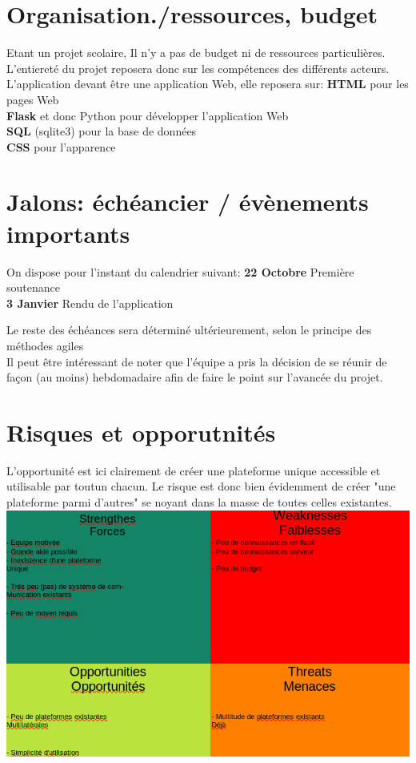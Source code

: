 \newpage

\section*{Organisation./ressources, budget}
Etant un projet scolaire, Il n'y a pas de budget ni de ressources particulières. L'entiereté du projet reposera donc sur les compétences des différents acteurs.\\
L'application devant être une application Web, elle reposera sur:
	\textbf{HTML} pour les pages Web \\
	\textbf{Flask} et donc Python pour développer l'application Web \\
	\textbf{SQL} (sqlite3) pour la base de données \\
	\textbf{CSS} pour l'apparence

\section*{Jalons: échéancier / évènements importants}
On dispose pour l'instant du calendrier suivant:
	\textbf{22 Octobre} Première soutenance \\
	\textbf{3 Janvier} Rendu de l'application

Le reste des échéances sera déterminé ultérieurement, selon le principe des méthodes agiles \\
Il peut être intéressant de noter que l'équipe a pris la décision de se réunir de façon (au moins) hebdomadaire afin de faire le point sur l'avancée du projet.


\section*{Risques et opporutnités}
L'opportunité est ici clairement de créer une plateforme unique accessible et utilisable par toutun chacun. Le risque est donc bien évidemment de créer "une plateforme parmi d'autres" se noyant dans la masse de toutes celles existantes.
\includegraphics{SWOT}
